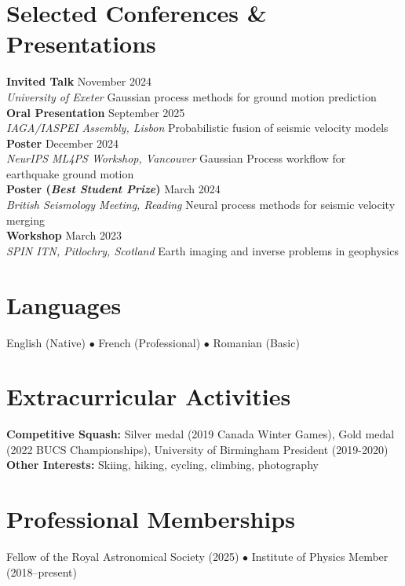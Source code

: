 \documentclass[11pt,a4paper]{article}
\newcommand{\cventry}[4]{%
    \noindent\textbf{#1} \hfill #2\\
    \textit{#3} \hfill #4\\[0.3em]
}
\begin{document}
\section*{Selected Conferences \& Presentations}
\cventry{Invited Talk}{November 2024}{University of Exeter}{Gaussian process methods for ground motion prediction}

\cventry{Oral Presentation}{September 2025}{IAGA/IASPEI Assembly, Lisbon}{Probabilistic fusion of seismic velocity models}

\cventry{Poster}{December 2024}{NeurIPS ML4PS Workshop, Vancouver}{Gaussian Process workflow for earthquake ground motion}

\cventry{Poster (\textit{Best Student Prize})}{March 2024}{British Seismology Meeting, Reading}{Neural process methods for seismic velocity merging}

\cventry{Workshop}{March 2023}{SPIN ITN, Pitlochry, Scotland}{Earth imaging and inverse problems in geophysics}

\section*{Languages}
English (Native) $\bullet$ French (Professional) $\bullet$ Romanian (Basic)

\section*{Extracurricular Activities}
\textbf{Competitive Squash:} Silver medal (2019 Canada Winter Games), Gold medal (2022 BUCS Championships), University of Birmingham President (2019-2020) \\
\textbf{Other Interests:} Skiing, hiking, cycling, climbing, photography

\section*{Professional Memberships}
Fellow of the Royal Astronomical Society (2025) $\bullet$ Institute of Physics Member (2018--present)
\end{document}

